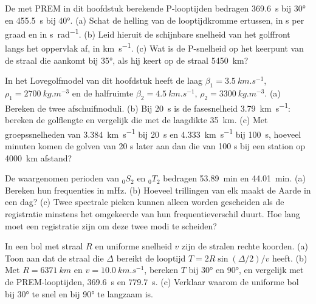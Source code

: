 \begin{exercise}[$\star$]\label{exo:b3:seismology-imaging:2}
De met PREM in dit hoofdstuk berekende P-looptijden bedragen \qty{369.6}{s} bij \ang{30}
en \qty{455.5}{s} bij \ang{40}. (a) Schat de helling van de looptijdkromme
ertussen, in \unit{s} per graad en in \unit{s.rad^{-1}}. (b) Leid hieruit
de schijnbare snelheid van het golffront langs het oppervlak af, in
\unit{km.s^{-1}}. (c) Wat is de P-snelheid op het keerpunt van de straal
die aankomt bij \ang{35}, als hij keert op de straal \qty{5450}{km}?
\end{exercise}

\begin{exercise}[$\star$]\label{exo:b3:seismology-imaging:3}
In het Lovegolfmodel van dit hoofdstuk heeft de laag $\beta_1 =
\qty{3.5}{km.s^{-1}}$, $\rho_1 = \qty{2700}{kg.m^{-3}}$ en de halfruimte
$\beta_2 = \qty{4.5}{km.s^{-1}}$, $\rho_2 = \qty{3300}{kg.m^{-3}}$.
(a) Bereken de twee afschuifmoduli. (b) Bij \qty{20}{s} is de fasesnelheid
\qty{3.79}{km.s^{-1}}: bereken de golflengte en vergelijk die met de laagdikte
\qty{35}{km}. (c) Met groepssnelheden van \qty{3.384}{km.s^{-1}} bij
\qty{20}{s} en \qty{4.333}{km.s^{-1}} bij \qty{100}{s}, hoeveel minuten komen de
golven van 20 s later aan dan die van 100 s bij een station op \qty{4000}{km} afstand?
\end{exercise}

\begin{exercise}[$\star$]\label{exo:b3:seismology-imaging:4}
De waargenomen perioden van ${}_0S_2$ en ${}_0T_2$ bedragen \qty{53.89}{min} en
\qty{44.01}{min}. (a) Bereken hun frequenties in \unit{mHz}. (b) Hoeveel
trillingen van elk maakt de Aarde in een dag? (c) Twee spectrale pieken
kunnen alleen worden gescheiden als de registratie minstens het omgekeerde van hun
frequentieverschil duurt. Hoe lang moet een registratie zijn om deze twee modi te scheiden?
\end{exercise}

\begin{exercise}[$\star\star$]\label{exo:b3:seismology-imaging:5}
In een bol met straal $R$ en uniforme snelheid $v$ zijn de stralen rechte koorden.
(a) Toon aan dat de straal die $\Delta$ bereikt de looptijd
$T = 2R\sin(\Delta/2)/v$ heeft. (b) Met $R = \qty{6371}{km}$ en
$v = \qty{10.0}{km.s^{-1}}$, bereken $T$ bij \ang{30} en \ang{90}, en vergelijk
met de PREM-looptijden, \qty{369.6}{s} en \qty{779.7}{s}. (c) Verklaar waarom de
uniforme bol bij \ang{30} te snel en bij \ang{90} te langzaam is.
\end{exercise}

